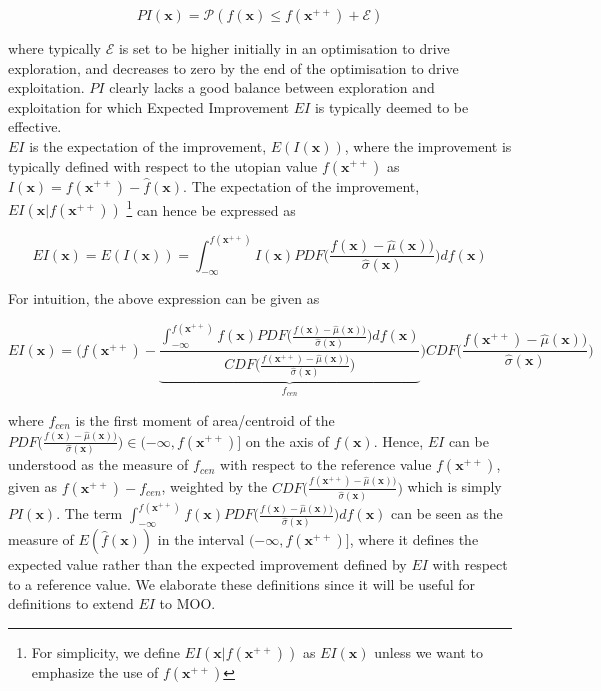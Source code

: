  \begin{equation}\label{PI_e}
 PI(\bm x) = \mathcal{P}({f}(\bm x)\leq f(\bm{x}^{++})+\mathscr{E})
 \end{equation}
 
 where typically $\mathscr{E}$ is set to be higher initially in an optimisation to drive exploration, and decreases to zero by the end of the optimisation to drive exploitation. $PI$ clearly lacks a good balance between exploration and exploitation for which Expected Improvement $EI$ is typically deemed to be effective.\\
 
 $EI$ is the expectation of the improvement,  $E(I(\bm x))$, where the improvement is typically defined with respect to the utopian value $f(\bm{x}^{++})$  as  $I(\bm x)= f(\bm{x}^{++})-\hat{f}(\bm x)$. The expectation of the improvement, $EI(\bm x|f(\bm{x}^{++}))$ \footnote{For simplicity, we define $EI(\bm x|f(\bm{x}^{++}))$ as $EI(\bm x)$ unless we want to emphasize the use of $f(\bm{x}^{++})$} can hence be expressed as
 
 \begin{equation}\label{EI_raw}
EI(\bm x)=E(I(\bm x)) = \int_{-\infty}^{{f}(\bm x^{++})} I(\bm x)PDF\bigg( \frac{f(\bm{x}) - \hat\mu(\bm x))}{\hat\sigma(\bm x)} \bigg) d{f}(\bm x)
\end{equation}
 
 For intuition, the above expression can be given as 
 
 \begin{equation}\label{EI_cent}
EI(\bm x) =  \Bigg(f(\bm x^{++}) - \underbrace{\frac{\int_{-\infty}^{{f}(\bm x^{++})} f(\bm{x}) PDF\bigg( \frac{f(\bm{x}) - \hat\mu(\bm x))}{\hat\sigma(\bm x)} \bigg) d{f}(\bm x)}{CDF\bigg( \frac{f(\bm{x}^{++}) - \hat\mu(\bm x))}{\hat\sigma(\bm x)} \bigg)}}_{f_{cen}}\Bigg) CDF\bigg( \frac{f(\bm{x}^{++}) - \hat\mu(\bm x))}{\hat\sigma(\bm x)} \bigg)
\end{equation}
 
 where $f_{cen}$ is the first moment of area/centroid of the $PDF \bigg( \frac{f(\bm{x}) - \hat\mu(\bm x))}{\hat\sigma(\bm x)} \bigg) \in (-\infty,{f}(\bm x^{++})]$ on the axis of ${f}(\bm x)$. 
Hence, $EI$ can be understood as the measure of $f_{cen}$ with respect to the reference value $f(\bm x^{++})$, given as $f(\bm x^{++}) - f_{cen}$, weighted by the $CDF\bigg( \frac{f(\bm{x}^{++}) - \hat\mu(\bm x))}{\hat\sigma(\bm x)} \bigg)$ which is simply $PI(\bm x)$. 
The term ${\int_{-\infty}^{{f}(\bm x^{++})} f(\bm{x}) PDF\bigg( \frac{f(\bm{x}) - \hat\mu(\bm x))}{\hat\sigma(\bm x)} \bigg) d{f}(\bm x)}$ can be seen as the measure of $E(\hat{f}(\bm x))$ in the interval 
 $(-\infty,{f}(\bm x^{++})]$, where it defines the expected value rather than the expected improvement  defined by $EI$ with respect to a reference value.  We elaborate these definitions since it will be useful for definitions to extend $EI$ to MOO. \\
 
